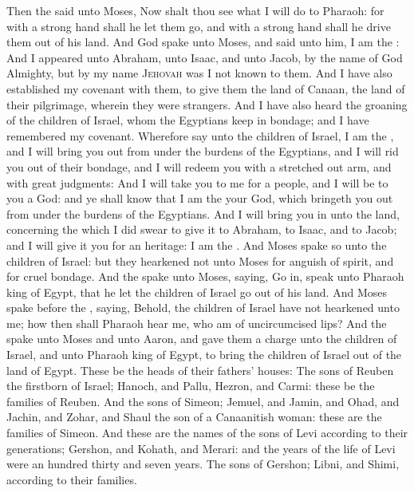 \begin{biblechapter} %
\verse Then the \LORD said unto Moses, Now shalt thou see what I will do to Pharaoh: for with a strong hand shall he let them go, and with a strong hand shall he drive them out of his land.
\verse And God spake unto Moses, and said unto him, I am the \LORD:
\verse And I appeared unto Abraham, unto Isaac, and unto Jacob, by the name of God Almighty, but by my name \textsc{Jehovah} was I not known to them.
\verse And I have also established my covenant with them, to give them the land of Canaan, the land of their pilgrimage, wherein they were strangers.
\verse And I have also heard the groaning of the children of Israel, whom the Egyptians keep in bondage; and I have remembered my covenant.
\verse Wherefore say unto the children of Israel, I am the \LORD, and I will bring you out from under the burdens of the Egyptians, and I will rid you out of their bondage, and I will redeem you with a stretched out arm, and with great judgments:
\verse And I will take you to me for a people, and I will be to you a God: and ye shall know that I am the \LORD your God, which bringeth you out from under the burdens of the Egyptians.
\verse And I will bring you in unto the land, concerning the which I did swear to give it to Abraham, to Isaac, and to Jacob; and I will give it you for an heritage: I am the \LORD.
\verse And Moses spake so unto the children of Israel: but they hearkened not unto Moses for anguish of spirit, and for cruel bondage.
\verse And the \LORD spake unto Moses, saying,
\verse Go in, speak unto Pharaoh king of Egypt, that he let the children of Israel go out of his land.
\verse And Moses spake before the \LORD, saying, Behold, the children of Israel have not hearkened unto me; how then shall Pharaoh hear me, who am of uncircumcised lips?
 And the \LORD spake unto Moses and unto Aaron, and gave them a charge unto the children of Israel, and unto Pharaoh king of Egypt, to bring the children of Israel out of the land of Egypt.
\verse These be the heads of their fathers' houses: The sons of Reuben the firstborn of Israel; Hanoch, and Pallu, Hezron, and Carmi: these be the families of Reuben.
\verse And the sons of Simeon; Jemuel, and Jamin, and Ohad, and Jachin, and Zohar, and Shaul the son of a Canaanitish woman: these are the families of Simeon.
\verse And these are the names of the sons of Levi according to their generations; Gershon, and Kohath, and Merari: and the years of the life of Levi were an hundred thirty and seven years.
\verse The sons of Gershon; Libni, and Shimi, according to their families.

\end{biblechapter}
